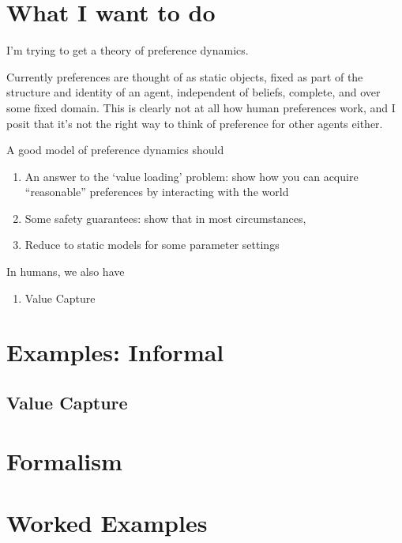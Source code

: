 \documentclass{article}
\begin{document}
	\section{What I want to do}
	I'm trying to get a theory of preference dynamics.
	
	Currently preferences are thought of as static objects, fixed as part of the structure and identity of an agent, independent of beliefs, complete, and over some fixed domain. This is clearly not at all how human preferences work, and I posit that it's not the right way to think of preference for other agents either.
	
	A good model of preference dynamics should
	\begin{enumerate}
		\item An answer to the `value loading' problem: show how you can acquire ``reasonable'' preferences by interacting with the world
		\item Some safety guarantees: show that in most circumstances, 
		\item Reduce to static models for some parameter settings
	\end{enumerate}

	In humans, we also have
	\begin{enumerate}
		\item Value Capture
	\end{enumerate}
	
	\section{Examples: Informal}
	
	
	\subsection{Value Capture}
	
	\section{Formalism}
	\section{Worked Examples}
\end{document}
